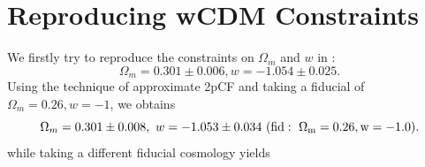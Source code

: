 \documentclass[useAMS,usenatbib]{mnras}
\begin{document}
\section{Reproducing wCDM Constraints}

We firstly try to reproduce the constraints on $\Omega_m$ and $w$ in \citep{Li2016}:
\begin{equation}\label{eq:wcdm_constrain_default}
 \Omega_m=0.301\pm 0.006, w=−1.054\pm 0.025.
\end{equation}
Using the technique of approximate 2pCF and taking a fiducial of $\Omega_m=0.26, w=-1$, we obtains
\begin{equation}
\Omega_m = 0.301 \pm 0.008,\ w=-1.053\pm 0.034\ (\rm fid:\ \Omega_m=0.26, w=-1.0).
\end{equation}
while taking a different fiducial cosmology yields
\end{document}
